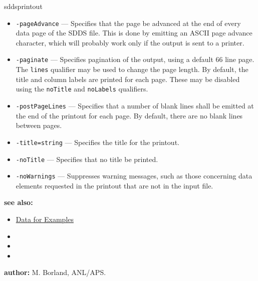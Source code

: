\begin{sddsprog}{sddsprintout}
\begin{itemize}
      \item \verb|-pageAdvance| --- Specifies that the page be advanced at the end of every data page of the SDDS file. This is done by emitting an ASCII page advance character, which will probably work only if the output is sent to a printer.
      \item \verb|-paginate| --- Specifies pagination of the output, using a default 66 line page. The \verb|lines| qualifier may be used to change the page length. By default, the title and column labels are printed for each page. These may be disabled using the \verb|noTitle| and \verb|noLabels| qualifiers.
      \item \verb|-postPageLines| --- Specifies that a number of blank lines shall be emitted at the end of the printout for each page. By default, there are no blank lines between pages.
      \item \verb|-title=string| --- Specifies the title for the printout.
      \item \verb|-noTitle| --- Specifies that no title be printed.
      \item \verb|-noWarnings| --- Suppresses warning messages, such as those concerning data elements requested in the printout that are not in the input file.
    \end{itemize}
  \item \textbf{see also:}
    \begin{itemize}
      \item \hyperref[exampleData]{Data for Examples}
      \item {}
      \item {}
      \item {}
    \end{itemize}
  \item \textbf{author:} M. Borland, ANL/APS.
\end{sddsprog}
